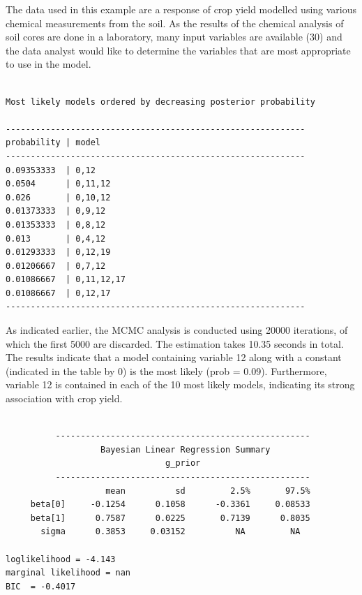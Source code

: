 \documentclass[article]{jss}
\begin{document}
The data used in this example are a response of crop yield modelled
using various chemical measurements from the soil. As the results of
the chemical analysis of soil cores are done in a laboratory, many
input variables are available (30) and the data analyst would like to
determine the variables that are most appropriate to use in the model.

%
\begin{minipage}[t]{1\columnwidth}%
\begin{verbatim}

Most likely models ordered by decreasing posterior probability

------------------------------------------------------------
probability | model       
------------------------------------------------------------
0.09353333  | 0,12        
0.0504      | 0,11,12     
0.026       | 0,10,12     
0.01373333  | 0,9,12      
0.01353333  | 0,8,12      
0.013       | 0,4,12      
0.01293333  | 0,12,19     
0.01206667  | 0,7,12      
0.01086667  | 0,11,12,17  
0.01086667  | 0,12,17     
------------------------------------------------------------

\end{verbatim}%
\end{minipage}

As indicated earlier, the MCMC analysis is conducted using 20000
iterations, of which the first 5000 are discarded. The estimation
takes 10.35 seconds in total.  The results indicate that a model
containing variable 12 along with a constant (indicated in the table
by 0) is the most likely (prob = 0.09). Furthermore, variable 12 is
contained in each of the 10 most likely models, indicating its strong
association with crop yield.

%
\begin{minipage}[t]{1\columnwidth}%
\begin{verbatim}

          ---------------------------------------------------           
                   Bayesian Linear Regression Summary                   
                                g_prior                                 
          ---------------------------------------------------           
                    mean          sd         2.5%       97.5%
     beta[0]     -0.1254      0.1058      -0.3361     0.08533
     beta[1]      0.7587      0.0225       0.7139      0.8035
       sigma      0.3853     0.03152          NA         NA

loglikelihood = -4.143      
marginal likelihood = nan         
BIC  = -0.4017     

\end{verbatim}%
\end{minipage}
\end{document}
